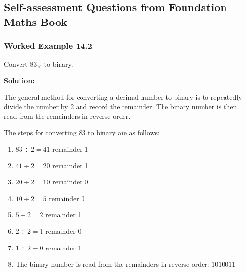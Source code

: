 \documentclass{article}
\begin{document}
\newpage
\subsection*{Self-assessment Questions from Foundation Maths Book}
\subsubsection*{Worked Example 14.2} Convert $83_{10}$ to binary.

\vspace*{0.5cm}

\noindent \textbf{Solution:}

\vspace*{0.25cm}

\noindent The general method for converting a decimal number to binary is to repeatedly divide the number by 2 and record the remainder. 
The binary number is then read from the remainders in reverse order.

\vspace*{0.25cm}

\noindent The steps for converting 83 to binary are as follows:

\begin{enumerate}
    \item $83 \div 2 = 41$ remainder 1
    \item $41 \div 2 = 20$ remainder 1
    \item $20 \div 2 = 10$ remainder 0
    \item $10 \div 2 = 5$ remainder 0
    \item $5 \div 2 = 2$ remainder 1
    \item $2 \div 2 = 1$ remainder 0
    \item $1 \div 2 = 0$ remainder 1
    \item The binary number is read from the remainders in reverse order: $1010011$
\end{enumerate}

\vspace*{0.5cm}

\end{document}
